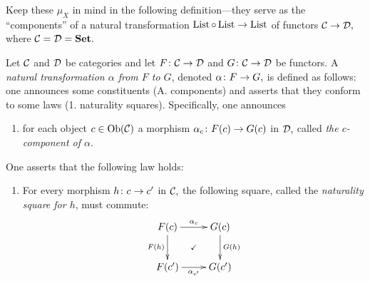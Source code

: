 \documentclass[../main/CT4S-EN-RU]{subfiles}
\begin{document}
\begin{blockENG}
Keep these $\mu_X$ in mind in the following definition—they serve as the “components” of a natural transformation $\operatorname{List}\circ\operatorname{List}\rightarrow\operatorname{List}$ of functors $\mathcal{C}\rightarrow\mathcal{D},$ where $\mathcal{C}=\mathcal{D}={\mathbf{Set}}.$
\end{blockENG}

\begin{blockRUS}
\end{blockRUS}

\begin{definitionENG}\label{def:natural transformation}
Let $\mathcal{C}$ and $\mathcal{D}$ be categories and let $F\colon\mathcal{C}\rightarrow\mathcal{D}$ and $G\colon\mathcal{C}\rightarrow\mathcal{D}$ be functors. A {\em natural transformation $\alpha$ from $F$ to $G$}, denoted $\alpha\colon F\rightarrow G,$ is defined as follows: one announces some constituents (A. components) and asserts that they conform to some laws (1. naturality squares). Specifically, one announces
\begin{enumerate}[\hsp A.]
\item for each object $c\in\operatorname{Ob}(\mathcal{C})$ a morphism $\alpha_c\colon F(c)\rightarrow G(c)$ in $\mathcal{D},$ called {\em the $c$-component of $\alpha$}.
\end{enumerate}
One asserts that the following law holds:
\begin{enumerate}[\hsp 1.]
\item For every morphism $h\colon c\rightarrow c'$ in $\mathcal{C},$ the following square, called the {\em naturality square for $h$}, must commute:
\begin{align}\label{dia:naturality square}
\xymatrix{F(c)\ar@{}[dr]|{\checkmark}\ar[d]_{F(h)}\ar[r]^{\alpha_c}&G(c)\ar[d]^{G(h)}\\F(c')\ar[r]_{\alpha_{c'}}&G(c')}
\end{align}
\end{enumerate}
\end{definitionENG}

\begin{definitionRUS}\label{def:natural transformation}
\end{definitionRUS}
\end{document}
